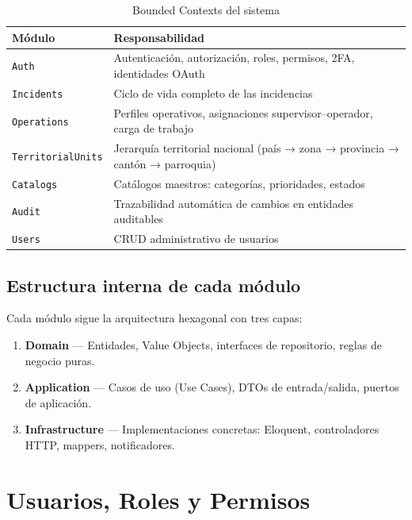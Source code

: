 \documentclass[11pt, a4paper]{article}
\begin{document}
\begin{table}[H]
\centering
\begin{tabularx}{\textwidth}{l X}
  \toprule
  \textbf{Módulo} & \textbf{Responsabilidad} \\
  \midrule
  \texttt{Auth}              & Autenticación, autorización, roles, permisos, 2FA, identidades OAuth \\
  \texttt{Incidents}         & Ciclo de vida completo de las incidencias \\
  \texttt{Operations}        & Perfiles operativos, asignaciones supervisor--operador, carga de trabajo \\
  \texttt{TerritorialUnits}  & Jerarquía territorial nacional (país → zona → provincia → cantón → parroquia) \\
  \texttt{Catalogs}          & Catálogos maestros: categorías, prioridades, estados \\
  \texttt{Audit}             & Trazabilidad automática de cambios en entidades auditables \\
  \texttt{Users}             & CRUD administrativo de usuarios \\
  \bottomrule
\end{tabularx}
\caption{Bounded Contexts del sistema}
\end{table}

\subsection{Estructura interna de cada módulo}

Cada módulo sigue la arquitectura hexagonal con tres capas:

\begin{enumerate}[leftmargin=2cm]
  \item \textbf{Domain} — Entidades, Value Objects, interfaces de repositorio, reglas de negocio puras.
  \item \textbf{Application} — Casos de uso (Use Cases), DTOs de entrada/salida, puertos de aplicación.
  \item \textbf{Infrastructure} — Implementaciones concretas: Eloquent, controladores HTTP, mappers, notificadores.
\end{enumerate}


\section{Usuarios, Roles y Permisos}
\end{document}
